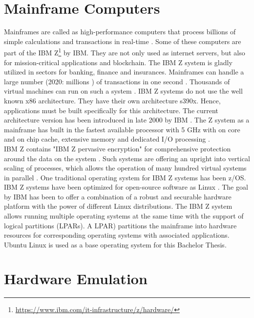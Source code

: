 \section{Mainframe Computers}

Mainframes are called as high-performance computers that process billions of simple calculations and transactions in real-time \cite{IBM}. Some of these computers are part of the IBM Z\footnote{\url{https://www.ibm.com/it-infrastructure/z/hardware/}} by IBM. They are not only used as internet servers, but also for mission-critical applications and blockchain. 
The IBM Z system is gladly utilized in sectors for banking, finance and insurances.
Mainframes can handle a large number (2020: millions \cite{IBM2}) of transactions in one second \cite[~p.56]{Tanenbaum2014}. 
Thousands of virtual machines can run on such a system \cite{OpenMainframeProject}. \gls{IBM Z systems} do not use the well known x86 architecture. 
They have their own architecture s390x. Hence, applications must be built specifically for this architecture. 
The current architecture version has been introduced in late 2000 by IBM \cite[~p.15]{Block2019}. The Z system as a mainframe has built in the fastest available processor with 5 GHz with on core and on chip cache, extensive memory and dedicated I/O processing \cite{OpenMainframeProject}.
\\
IBM Z contains "IBM Z pervasive encryption" for comprehensive protection around the data on the system \cite[~p.4]{Lascu2020}. Such systems are offering an upright into vertical \gls{scaling} of processes, which allows the operation of many hundred virtual systems in parallel \cite[~p.13]{Tschoeke2009}. One traditional operating system for IBM Z systems has been z/OS. 
IBM Z systems have been optimized for open-source software as Linux \cite[~p.8]{Lascu2020}. The goal by IBM has been to offer a combination of a robust and securable hardware platform with the power of different Linux distributions. 
The IBM Z system allows running multiple operating systems at the same time with the support of logical partitions (LPARs).
A \gls{LPAR}) partitions the mainframe into hardware resources for corresponding operating systems with associated applications. \\
Ubuntu Linux is used as a base operating system for this Bachelor Thesis.


\section{Hardware Emulation}

